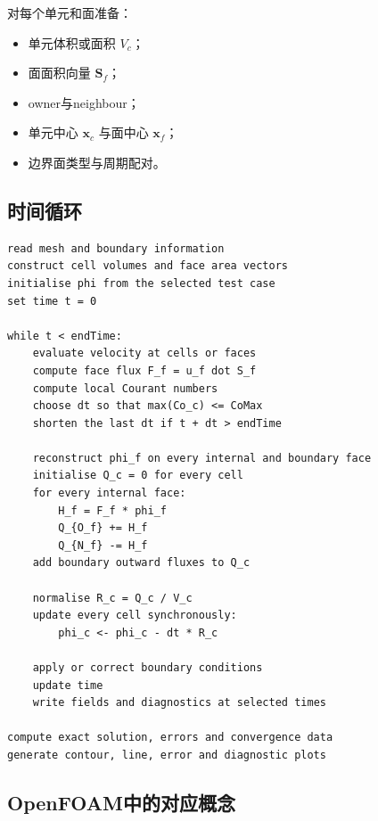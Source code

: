 \documentclass[UTF8,12pt,a4paper,fontset=fandol]{ctexart}
\numberwithin{equation}{section}
\newcommand{\Sf}{\bm S}
\newcommand{\xf}{\bm x}
\begin{document}
对每个单元和面准备：

\begin{itemize}
  \item 单元体积或面积 $V_c$；
  \item 面面积向量 $\Sf_f$；
  \item owner与neighbour；
  \item 单元中心 $\xf_c$ 与面中心 $\xf_f$；
  \item 边界面类型与周期配对。
\end{itemize}

\subsection{时间循环}

\begin{lstlisting}[style=algorithm]
read mesh and boundary information
construct cell volumes and face area vectors
initialise phi from the selected test case
set time t = 0

while t < endTime:
    evaluate velocity at cells or faces
    compute face flux F_f = u_f dot S_f
    compute local Courant numbers
    choose dt so that max(Co_c) <= CoMax
    shorten the last dt if t + dt > endTime

    reconstruct phi_f on every internal and boundary face
    initialise Q_c = 0 for every cell
    for every internal face:
        H_f = F_f * phi_f
        Q_{O_f} += H_f
        Q_{N_f} -= H_f
    add boundary outward fluxes to Q_c

    normalise R_c = Q_c / V_c
    update every cell synchronously:
        phi_c <- phi_c - dt * R_c

    apply or correct boundary conditions
    update time
    write fields and diagnostics at selected times

compute exact solution, errors and convergence data
generate contour, line, error and diagnostic plots
\end{lstlisting}

\subsection{OpenFOAM中的对应概念}
\end{document}
